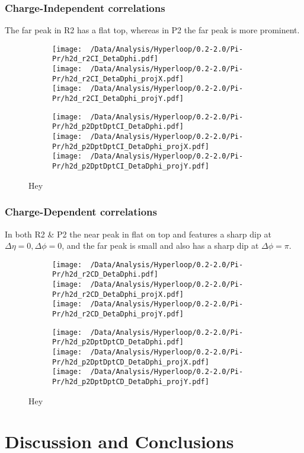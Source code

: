 \documentclass[12pt,a4paper,twoside]{report}
\begin{document}
\subsection{Charge-Independent correlations}
The far peak in R2 has a flat top, whereas in P2 the far peak is more prominent.
\begin{figure}[H]
	\begin{subfigure}{0.49\linewidth}
		\texttt{[image: ~/Data/Analysis/Hyperloop/0.2-2.0/Pi-Pr/h2d\_r2CI\_DetaDphi.pdf]}\\
		\texttt{[image: ~/Data/Analysis/Hyperloop/0.2-2.0/Pi-Pr/h2d\_r2CI\_DetaDphi\_projX.pdf]}\\
		\texttt{[image: ~/Data/Analysis/Hyperloop/0.2-2.0/Pi-Pr/h2d\_r2CI\_DetaDphi\_projY.pdf]}\\
	\end{subfigure}
	\begin{subfigure}{0.49\linewidth}
		\texttt{[image: ~/Data/Analysis/Hyperloop/0.2-2.0/Pi-Pr/h2d\_p2DptDptCI\_DetaDphi.pdf]}\\
		\texttt{[image: ~/Data/Analysis/Hyperloop/0.2-2.0/Pi-Pr/h2d\_p2DptDptCI\_DetaDphi\_projX.pdf]}\\
		\texttt{[image: ~/Data/Analysis/Hyperloop/0.2-2.0/Pi-Pr/h2d\_p2DptDptCI\_DetaDphi\_projY.pdf]}\\
	\end{subfigure}
	\caption{Hey}
\end{figure}
\subsection{Charge-Dependent correlations}
In both R2 \& P2 the near peak in flat on top and features a sharp dip at $\Delta\eta=0,\Delta\phi=0$, and the far peak is small and also has a sharp dip at $\Delta\phi=\pi$.
\begin{figure}[H]
	\begin{subfigure}{0.49\linewidth}
		\texttt{[image: ~/Data/Analysis/Hyperloop/0.2-2.0/Pi-Pr/h2d\_r2CD\_DetaDphi.pdf]}\\
		\texttt{[image: ~/Data/Analysis/Hyperloop/0.2-2.0/Pi-Pr/h2d\_r2CD\_DetaDphi\_projX.pdf]}\\
		\texttt{[image: ~/Data/Analysis/Hyperloop/0.2-2.0/Pi-Pr/h2d\_r2CD\_DetaDphi\_projY.pdf]}\\
	\end{subfigure}
	\begin{subfigure}{0.49\linewidth}
		\texttt{[image: ~/Data/Analysis/Hyperloop/0.2-2.0/Pi-Pr/h2d\_p2DptDptCD\_DetaDphi.pdf]}\\
		\texttt{[image: ~/Data/Analysis/Hyperloop/0.2-2.0/Pi-Pr/h2d\_p2DptDptCD\_DetaDphi\_projX.pdf]}\\
		\texttt{[image: ~/Data/Analysis/Hyperloop/0.2-2.0/Pi-Pr/h2d\_p2DptDptCD\_DetaDphi\_projY.pdf]}\\
	\end{subfigure}
	\caption{Hey}
\end{figure}
\chapter{Discussion and Conclusions}\label{Ch:Conclusions}
\end{document}
